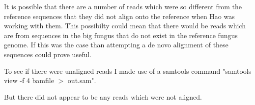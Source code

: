 \documentclass[../main.tex]{subfiles}
\begin{document}
%
%


It is possible that there are a number of reads which were so different from the reference sequences that they did not align onto the reference when Hao was working with them. This possibilty could mean that there would be reads which are from sequences in the big fungus that do not exist in the reference fungus genome. If this was the case than attempting a de novo alignment of these sequences could prove useful. 

To see if there were unaligned reads I made use of a samtools command "samtools view -f 4 bamfile $>$ out.sam". 

But there did not appear to be any reads which were not aligned. 
\end{document}
